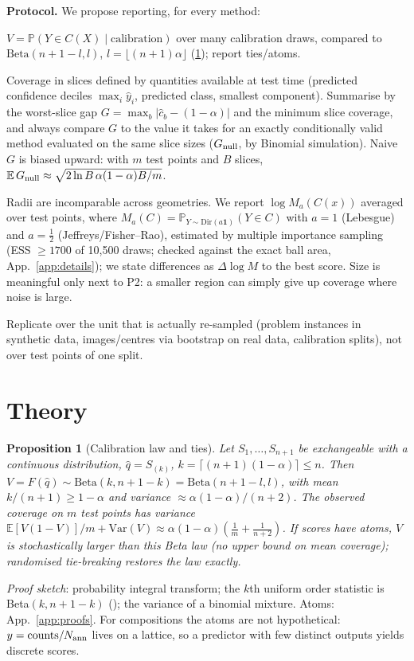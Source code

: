 \documentclass{article}
\theoremstyle{plain}
\newtheorem{proposition}[theorem]{Proposition}
\theoremstyle{remark}
\newcommand{\yh}{\hat y}
\newcommand{\E}{\mathbb{E}}
\renewcommand{\Pr}{\mathbb{P}}
\begin{document}
\textbf{Protocol.} We propose reporting, for every method:
\begin{description}\itemsep1pt
\item[P1 Coverage as a distribution.] $V=\Pr(Y\in C(X)\mid\text{calibration})$ over many calibration draws, compared to $\mathrm{Beta}(n+1-l,l)$, $l=\lfloor(n+1)\alpha\rfloor$ (\cref{prop:beta}); report ties/atoms.
\item[P2 Conditional diagnostics.] Coverage in slices defined by quantities available at test time (predicted confidence deciles $\max_i\yh_i$, predicted class, smallest component). Summarise by the worst-slice gap $G=\max_b|\hat c_b-(1-\alpha)|$ and the minimum slice coverage, and always compare $G$ to the value it takes for an exactly conditionally valid method evaluated on the same slice sizes ($G_{\rm null}$, by Binomial simulation). Naive $G$ is biased upward: with $m$ test points and $B$ slices, $\E\,G_{\rm null}\approx\sqrt{2\ln B\,\alpha(1-\alpha)B/m}$.
\item[P3 Size on the simplex.] Radii are incomparable across geometries. We report $\log M_a(C(x))$ averaged over test points, where $M_a(C)=\Pr_{Y\sim\mathrm{Dir}(a\mathbf 1)}(Y\in C)$ with $a=1$ (Lebesgue) and $a=\tfrac12$ (Jeffreys/Fisher--Rao), estimated by multiple importance sampling (ESS $\ge 1700$ of 10{,}500 draws; checked against the exact ball area, App.~\ref{app:details}); we state differences as $\Delta\log M$ to the best score. Size is meaningful only next to P2: a smaller region can simply give up coverage where noise is large.
\item[P4 Uncertainty at the right level.] Replicate over the unit that is actually re-sampled (problem instances in synthetic data, images/centres via bootstrap on real data, calibration splits), not over test points of one split.
\end{description}

\section{Theory}\label{sec:theory}
\begin{proposition}[Calibration law and ties]\label{prop:beta}
Let $S_1,\dots,S_{n+1}$ be exchangeable with a continuous distribution, $\hat q=S_{(k)}$, $k=\lceil(n+1)(1-\alpha)\rceil\le n$. Then $V=F(\hat q)\sim\mathrm{Beta}(k,n+1-k)=\mathrm{Beta}(n+1-l,l)$, with mean $k/(n+1)\ge 1-\alpha$ and variance $\approx\alpha(1-\alpha)/(n+2)$. The observed coverage on $m$ test points has variance $\E[V(1-V)]/m+\mathrm{Var}(V)\approx\alpha(1-\alpha)(\frac1m+\frac1{n+2})$. If scores have atoms, $V$ is stochastically larger than this Beta law (no upper bound on mean coverage); randomised tie-breaking restores the law exactly.
\end{proposition}
\emph{Proof sketch}: probability integral transform; the $k$th uniform order statistic is Beta$(k,n+1-k)$ (\citealt{vovk2012}); the variance of a binomial mixture. Atoms: App.~\ref{app:proofs}.
For compositions the atoms are not hypothetical: $y=\text{counts}/N_{\rm ann}$ lives on a lattice, so a predictor with few distinct outputs yields discrete scores.
\end{document}

